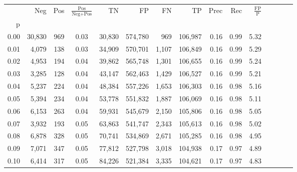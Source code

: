 \begin{tabular}{rrrcrrrrrrrrrrr}
\toprule
{} &     Neg &    Pos & $\frac{\text{Pos}}{\text{Neg}+\text{Pos}}$ &       TN &       FP &       FN &       TP &  Prec &   Rec & $\frac{\text{FP}}{\text{P}}$ \\
p    &         &        &                                            &          &          &          &          &       &       &                              \\
\midrule
0.00 &  30,830 &    969 &                                       0.03 &   30,830 &  574,780 &      969 &  106,987 &  0.16 &  0.99 &                         5.32 \\
0.01 &   4,079 &    138 &                                       0.03 &   34,909 &  570,701 &    1,107 &  106,849 &  0.16 &  0.99 &                         5.29 \\
0.02 &   4,953 &    194 &                                       0.04 &   39,862 &  565,748 &    1,301 &  106,655 &  0.16 &  0.99 &                         5.24 \\
0.03 &   3,285 &    128 &                                       0.04 &   43,147 &  562,463 &    1,429 &  106,527 &  0.16 &  0.99 &                         5.21 \\
0.04 &   5,237 &    224 &                                       0.04 &   48,384 &  557,226 &    1,653 &  106,303 &  0.16 &  0.98 &                         5.16 \\
0.05 &   5,394 &    234 &                                       0.04 &   53,778 &  551,832 &    1,887 &  106,069 &  0.16 &  0.98 &                         5.11 \\
0.06 &   6,153 &    263 &                                       0.04 &   59,931 &  545,679 &    2,150 &  105,806 &  0.16 &  0.98 &                         5.05 \\
0.07 &   3,932 &    193 &                                       0.05 &   63,863 &  541,747 &    2,343 &  105,613 &  0.16 &  0.98 &                         5.02 \\
0.08 &   6,878 &    328 &                                       0.05 &   70,741 &  534,869 &    2,671 &  105,285 &  0.16 &  0.98 &                         4.95 \\
0.09 &   7,071 &    347 &                                       0.05 &   77,812 &  527,798 &    3,018 &  104,938 &  0.17 &  0.97 &                         4.89 \\
0.10 &   6,414 &    317 &                                       0.05 &   84,226 &  521,384 &    3,335 &  104,621 &  0.17 &  0.97 &                         4.83 \\

\end{tabular}
